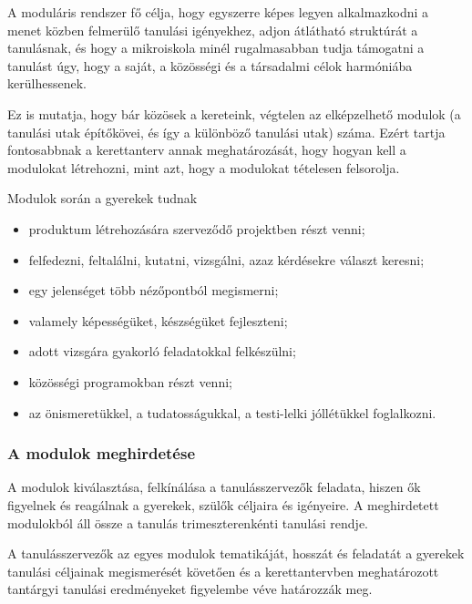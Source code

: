 A moduláris rendszer fő célja, hogy egyszerre képes legyen
alkalmazkodni a menet közben felmerülő tanulási igényekhez, adjon
átlátható\linebreak
struktúrát a tanulásnak, és hogy a mikroiskola minél rugalmasabban tudja támogatni a tanulást úgy, hogy a saját, a közösségi és a társadalmi célok harmóniába kerülhessenek.

Ez is mutatja, hogy bár közösek a kereteink, végtelen az elképzelhető modulok (a tanulási utak építőkövei, és így a különböző tanulási utak) száma. Ezért tartja fontosabbnak a kerettanterv annak meghatározását, hogy hogyan kell a modulokat létrehozni, mint azt, hogy a modulokat tételesen felsorolja.
\newpage

Modulok során a gyerekek tudnak

\begin{itemize}
      \item produktum létrehozására szerveződő projektben részt venni;

      \item felfedezni, feltalálni, kutatni, vizsgálni, azaz kérdésekre választ keresni;

      \item egy jelenséget több nézőpontból megismerni;

      \item valamely képességüket, készségüket fejleszteni;

      \item adott vizsgára gyakorló feladatokkal felkészülni;

      \item közösségi programokban részt venni;

      \item az önismeretükkel, a tudatosságukkal, a testi-lelki jóllétükkel fog\-lal\-kozni.
\end{itemize}

\subsubsection{A modulok meghirdetése}
\label{sec:modulok_meghirdetese}
A modulok kiválasztása, felkínálása a tanulásszervezők feladata, hiszen ők figyelnek és reagálnak a gyerekek, szülők céljaira és igényeire. A meghirdetett modulokból áll össze a tanulás trimeszterenkénti tanulási rendje.

A tanulásszervezők az egyes modulok tematikáját, hosszát és feladatát a gyerekek tanulási céljainak megismerését követően és a kerettantervben meghatározott tantárgyi tanulási eredményeket figyelembe véve határozzák meg.

